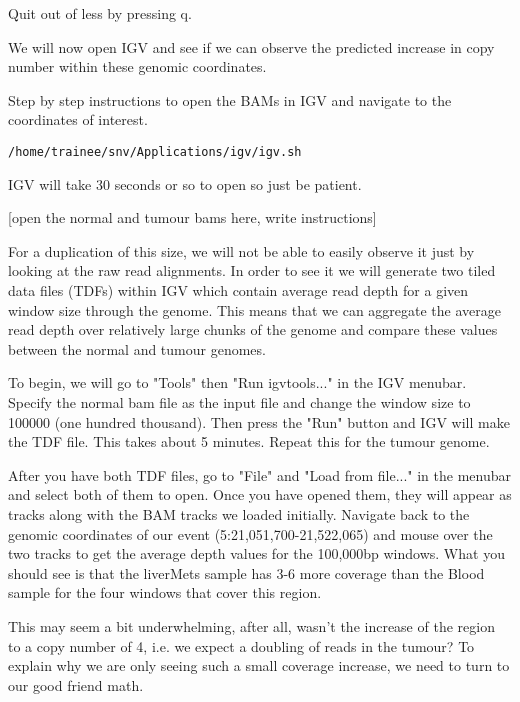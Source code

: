 Quit out of less by pressing q.

We will now open IGV and see if we can observe the predicted increase in copy number within these genomic coordinates.

\begin{steps}
Step by step instructions to open the BAMs in IGV and navigate to the coordinates of interest.

\begin{lstlisting}
/home/trainee/snv/Applications/igv/igv.sh
\end{lstlisting}
\end{steps}

IGV will take 30 seconds or so to open so just be patient.

[open the normal and tumour bams here, write instructions]

For a duplication of this size, we will not be able to easily observe it just by looking at the raw read alignments. In order to see it we will generate two tiled data files (TDFs) within IGV which contain average read depth for a given window size through the genome. This means that we can aggregate the average read depth over relatively large chunks of the genome and compare these values between the normal and tumour genomes.

To begin, we will go to "Tools" then "Run igvtools..." in the IGV menubar. Specify the normal bam file as the input file and change the window size to 100000 (one hundred thousand). Then press the "Run" button and IGV will make the TDF file. This takes about 5 minutes. Repeat this for the tumour genome.

After you have both TDF files, go to "File" and "Load from file..." in the menubar and select both of them to open. Once you have opened them, they will appear as tracks along with the BAM tracks we loaded initially. Navigate back to the genomic coordinates of our event (5:21,051,700-21,522,065) and mouse over the two tracks to get the average depth values for the 100,000bp windows. What you should see is that the liverMets sample has 3-6 more coverage than the Blood sample for the four windows that cover this region.

This may seem a bit underwhelming, after all, wasn't the increase of the region to a copy number of 4, i.e. we expect a doubling of reads in the tumour? To explain why we are only seeing such a small coverage increase, we need to turn to our good friend math.


